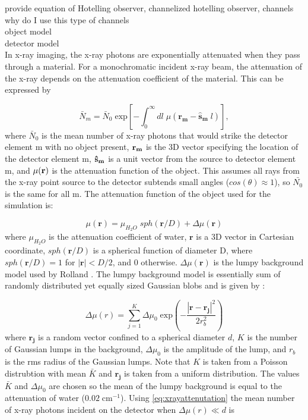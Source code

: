 provide equation of Hotelling observer, channelized hotelling observer, channels\\
why do I use this type of channels\\
object model\\
detector model\\

In x-ray imaging, the x-ray photons are exponentially attenuated when they pass through a material.  For a monochromatic incident x-ray beam, the attenuation of the x-ray depends on the attenuation coefficient of the material.  This can be expressed by \citep{Barrett2004}

\begin{equation}\label{eq:xrayattenutation}
\bar{N}_{m} = \bar{N}_{0} \; \mathrm{exp} \left[ -\int_{0}^{\infty} dl \; \mu( \mathbf{r_{m}} - \mathbf{ \hat{s}_{m}} \; l) \right], 
\end{equation}
where $\bar{N}_{0}$ is the mean number of x-ray photons that would strike the detector element m with no object present, $\bf{r}_{m}$ is the 3D vector specifying the location of the detector element m, $\bf{\hat{s}_{m}}$ is a unit vector from the source to detector element m, and $\mu(\bf{r})$ is the attenuation function of the object.  This assumes all rays from the x-ray point source to the detector subtends small angles ($cos(\theta) \approx  1$), so $\bar{N_{0}}$ is the same for all m.  The attenuation function of the object used for the simulation is:

\begin{equation}\label{eq:xraymu}
\mu(\mathbf{r}) = \mu_{H_{2}O} \; sph(\mathbf{r} / D) + \Delta \mu(\mathbf{r})
\end{equation}
where $\mu_{H_{2}O}$ is the attenuation coefficient of water, $\mathbf{r}$ is a 3D vector in Cartesian coordinate, $sph(\mathbf{r}/D)$ is a spherical function of diameter D, where $sph(\mathbf{r}/D) = 1$ for $| \mathbf{r} | < D/2$, and 0 otherwise.  $\Delta \mu(\mathbf{r})$ is the lumpy background model used by Rolland \citep{Rolland1992}.  The lumpy background model is essentially sum of randomly distributed yet equally sized Gaussian blobs and is given by :

\begin{equation}\label{eq:lumpybg}
\Delta \mu(r) = \sum_{j = 1}^{K} \Delta\mu_0 \; 
				\mathrm{exp}( - \frac{|\mathbf{r} - \mathbf{r_j}|^2}{2r_b^2})
\end{equation}
where $\mathbf{r_j}$ is a random vector confined to a spherical diameter $d$, $K$ is the number of Gaussian lumps in the background, $\Delta \mu_0$ is the amplitude of the lump, and $r_b$ is the rms radius of the Gaussian lumps.  Note that $K$ is taken from a Poisson distrubtion with mean $\bar{K}$ and $\mathbf{r_j}$ is taken from a uniform distribution. 
The values $\bar{K}$ and $\Delta \mu_{0}$ are chosen so the mean of the lumpy background is equal to the attenuation of water ($\mathrm{0.02 \; cm^{-1}}$).  Using \eqref{eq:xrayattenutation} the mean number of x-ray photons incident on the detector when $\Delta \mu(r) \ll d$ is

